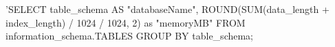 'SELECT table_schema AS "databaseName", ROUND(SUM(data_length + index_length) / 1024 /  1024, 2) as "memoryMB" FROM information_schema.TABLES GROUP BY table_schema;